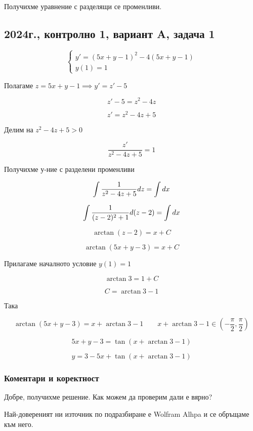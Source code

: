 \documentclass{scrartcl}
\begin{document}
Получихме уравнение с разделящи се променливи.

\subsection{2024г., контролно 1, вариант A, задача 1}

$$
\begin{cases}
y' = (5x+y-1)^2 - 4(5x+y-1)\\
y(1) = 1
\end{cases}
$$

Полагаме $z = 5x+y-1 \implies y' = z'-5$

$$z' - 5 = z^2 - 4z$$

$$z' = z^2-4z+5$$

Делим на $z^2-4z+5 > 0$

$$\dfrac{z'}{z^2-4z+5} = 1$$

Получихме у-ние с разделени променливи

$$\displaystyle \int \dfrac{1}{z^2-4z+5}\space dz = \int dx$$

$$\displaystyle \int \dfrac{1}{(z-2)^2+1}\space d(z-2) = \int dx$$

$$\arctan{(z-2)} = x + C$$

$$\arctan{(5x+y-3)} = x + C$$

Прилагаме началното условие $y(1) = 1$

$$\arctan{3} = 1+C$$

$$C = \arctan{3} - 1$$

Така

$$\arctan{(5x+y-3)} = x + \arctan{3} - 1 \qquad x + \arctan{3} - 1 \in \left(-\dfrac{\pi}{2}, \dfrac{\pi}{2}\right)$$

$$5x+y-3 = \tan{(x+\arctan{3} - 1)}$$

$$y = 3 - 5x + \tan{(x+\arctan{3} - 1)}$$

\subsubsection{Коментари и коректност}

\begin{FlushLeft}
Добре, получихме решение. Как можем да проверим дали е вярно?

Най-довереният ни източник по подразбиране е Wolfram Alhpa и се обръщаме към него.
\end{FlushLeft}
\end{document}

